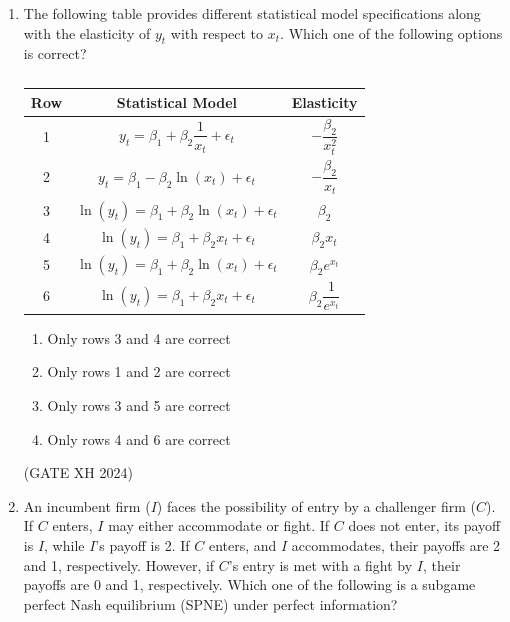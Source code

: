 \documentclass{article}
\begin{document}
\begin{enumerate}
    \item The following table provides different statistical model specifications along with the elasticity of $y_t$ with respect to $x_t$. Which one of the following options is correct?

    \begin{table}[h]
        \centering
        \begin{tabular}{|c|c|c|}
        \hline
            Row & Statistical Model & Elasticity \\ \hline
            1 & $y_t=\beta_1+\beta_2\dfrac{1}{x_t}+\epsilon_t$ & $-\dfrac{\beta_2}{x^2_t}$ \\ \hline
            2 & $y_t=\beta_1-\beta_2\ln{(x_t)}+\epsilon_t$ & $-\dfrac{\beta_2}{x_t}$ \\ \hline
            3 & $\ln{(y_t)}=\beta_1+\beta_2\ln{(x_t)}+\epsilon_t$ & $\beta_2$ \\ \hline
            4 & $\ln{(y_t)}=\beta_1+\beta_2x_t+\epsilon_t$ & $\beta_2x_t$ \\ \hline
            5 & $\ln{(y_t)}=\beta_1+\beta_2\ln{(x_t)}+\epsilon_t$ & $\beta_2e^{x_t}$ \\ \hline
            6 & $\ln{(y_t)}=\beta_1+\beta_2x_t+\epsilon_t$ & $\beta_2\dfrac{1}{e^{x_t}}$ \\ \hline
        \end{tabular}
        \caption{}
    \end{table}

    \begin{multicols}{2}
    \begin{enumerate}
        \item Only rows 3 and 4 are correct
        \item Only rows 1 and 2 are correct
        \item Only rows 3 and 5 are correct
        \item Only rows 4 and 6 are correct
    \end{enumerate}
    \end{multicols} \hfill (GATE XH 2024)

    \item An incumbent firm ($I$) faces the possibility of entry by a challenger firm ($C$). If $C$ enters, $I$ may either accommodate or fight. If $C$ does not enter, its payoff is $I$, while $I$’s payoff is 2. If $C$ enters, and $I$ accommodates, their payoffs are 2 and 1, respectively. However, if $C$’s entry is met with a fight by $I$, their payoffs are 0 and 1, respectively. Which one of the following is a subgame perfect Nash equilibrium (SPNE) under perfect information?


\end{enumerate}
\end{document}
